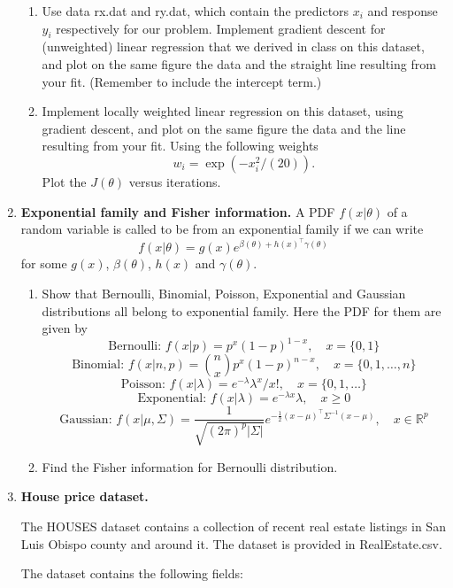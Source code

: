 \documentclass[11pt]{article}
\begin{document}
\begin{enumerate}
\begin{enumerate}
\item Use data \textsf{rx.dat} and \textsf{ry.dat}, which contain the predictors $x_i$ and response $y_i$ respectively for our problem. Implement gradient descent for (unweighted) linear regression that we derived in class on this dataset, and plot on the same figure the data and the straight line resulting from your fit. (Remember to include the intercept term.)

\item Implement locally weighted linear regression on this dataset, using gradient descent, and plot on the same figure the data and the line resulting from your fit. Using the following weights
%
\[
w_i = \exp(-x_i^2/(20)).
\] 
Plot the $J(\theta)$ versus iterations. 

 
\end{enumerate}

\item {\bf Exponential family and Fisher information.} 
A PDF $f(x|\theta)$ of a random variable is called to be from an exponential family if we can write 
\[
f(x|\theta) = g(x) e^{\beta(\theta) + h(x)^\top \gamma(\theta)}
\]
for some $g(x)$, $\beta(\theta)$, $h(x)$ and $\gamma(\theta)$.

\begin{enumerate}
\item Show that Bernoulli, Binomial, Poisson, Exponential and Gaussian distributions all belong to exponential family. Here the PDF for them are given by
\[
\mbox{Bernoulli:  }f(x|p) = p^x (1-p)^{1-x}, \quad x = \{0, 1\}
\]
\[
\mbox{Binomial:  }f(x|n, p) = {n \choose x} p^x (1-p)^{n-x}, \quad x = \{0, 1, \ldots, n\}
\]
\[
\mbox{Poisson: }f(x|\lambda) = e^{-\lambda} \lambda^x/x!, \quad x = \{0, 1, \ldots\}
\]
\[
\mbox{Exponential: }f(x|\lambda) = e^{-\lambda x} \lambda, \quad x\geq 0
\]
\[
\mbox{Gaussian: }f(x|\mu, \Sigma) = \frac{1}{\sqrt{(2\pi)^p|\Sigma|}}e^{-\frac{1}{2}(x-\mu)^\top \Sigma^{-1}(x-\mu)} , \quad x\in \mathbb{R}^p
\]
\item Find the Fisher information for Bernoulli distribution. \end{enumerate}

 
 

\item {\bf House price dataset.}

The HOUSES dataset contains a collection of recent real estate listings in San Luis Obispo county and around it. The dataset is provided in RealEstate.csv.

The dataset contains the following fields:


\end{enumerate}
\end{document}
